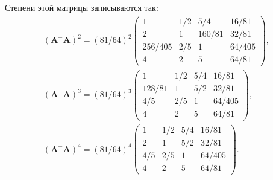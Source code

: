 \documentclass[specialist,
               substylefile = spbu.rtx,
               subf,href,colorlinks=true, 12pt]{disser}
\theoremstyle{definition}
\begin{document}
Степени этой матрицы записываются так:
\begin{gather*}
(\bm{A}^{-}\bm{A})^{2}
=
(81/64)^{2}
\begin{pmatrix}
1 &1/2 &5/4 &16/81\\
2 &1 &160/81 &32/81\\
256/405 &2/5 &1 &64/405\\
4 & 2 &5 &64/81
\end{pmatrix},\\
(\bm{A}^{-}\bm{A})^{3}
=
(81/64)^{3}
\begin{pmatrix}
1 &1/2 &5/4 &16/81\\
128/81 &1 &5/2 &32/81\\
4/5 &2/5 &1 &64/405\\
4 & 2 &5 &64/81
\end{pmatrix},
\\
(\bm{A}^{-}\bm{A})^{4}
=
(81/64)^{4}
\begin{pmatrix}
1 &1/2 &5/4 &16/81\\
2 &1 &5/2 &32/81\\
4/5 &2/5 &1 &64/405\\
4 & 2 &5 &64/81
\end{pmatrix}.
\end{gather*}

\end{document}
